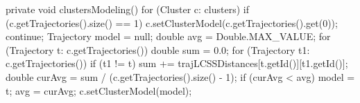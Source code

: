 private void clustersModeling() {
	for (Cluster c: clusters) {
		if (c.getTrajectories().size() == 1) {
			c.setClusterModel(c.getTrajectories().get(0));
			continue;
		}
		Trajectory model = null;
		double avg = Double.MAX_VALUE;
		for (Trajectory t: c.getTrajectories()) {
			double sum = 0.0;
			for (Trajectory t1: c.getTrajectories()) {
				if (t1 != t)
				sum += trajLCSSDistances[t.getId()][t1.getId()];
			}
			double curAvg = sum / (c.getTrajectories().size() - 1);
			if (curAvg < avg) {
				model = t;
				avg = curAvg;
			}
		}
		c.setClusterModel(model);
	}
}
